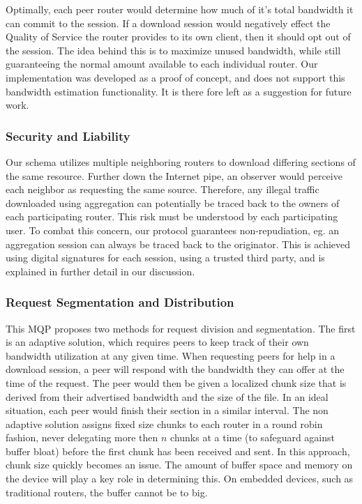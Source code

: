 \documentclass[12pt]{article}
\begin{document}
			Optimally, each peer router would determine how much of it's total bandwidth it can commit to the session. If a download session would negatively effect the Quality of Service the router provides to its own client, then it should opt out of the session. The idea behind this is to maximize unused bandwidth, while still guaranteeing the normal amount available to each individual router. Our implementation was developed as a proof of concept, and does not support this bandwidth estimation functionality. It is there fore left as a suggestion for future work.

		\subsubsection{Security and Liability}

			Our schema utilizes multiple neighboring routers to download differing sections of the same resource. Further down the Internet pipe, an observer would perceive each neighbor as requesting the same source. Therefore, any illegal traffic downloaded using aggregation can potentially be traced back to the owners of each participating router. This risk must be understood by each participating user. To combat this concern, our protocol guarantees non-repudiation, eg. an aggregation session can always be traced back to the originator. This is achieved using digital signatures for each session, using a trusted third party, and is explained in further detail in our discussion.

		\subsubsection{Request Segmentation and Distribution}

			This MQP proposes two methods for request division and segmentation. The first is an adaptive solution, which requires peers to keep track of their own bandwidth utilization at any given time. When requesting peers for help in a download session, a peer will respond with the bandwidth they can offer at the time of the request. The peer would then be given a localized chunk size that is derived from their advertised bandwidth and the size of the file. In an ideal situation, each peer would finish their section in a similar interval. The non adaptive solution assigns fixed size chunks to each router in a round robin fashion, never delegating more then $n$ chunks at a time (to safeguard against buffer bloat) before the first chunk has been received and sent. In this approach, chunk size quickly becomes an issue. The amount of buffer space and memory on the device will play a key role in determining this. On embedded devices, such as traditional routers, the buffer cannot be to big.
\end{document}
